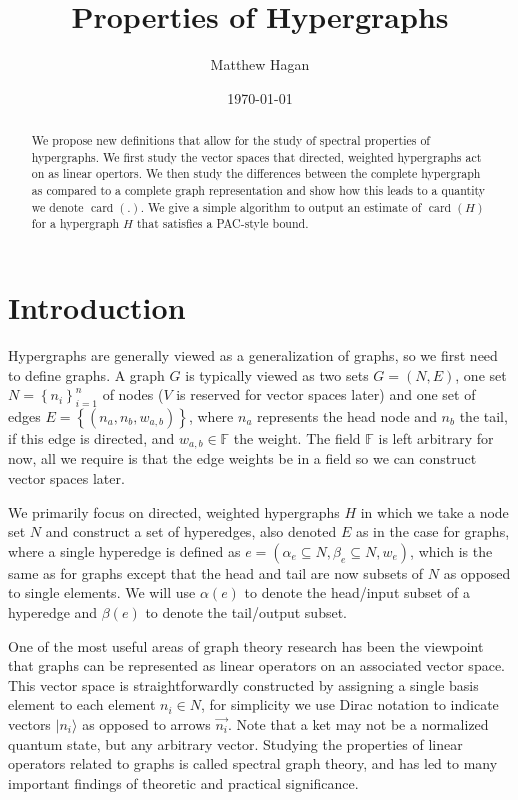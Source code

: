 \documentclass{article}
\title{Properties of Hypergraphs}
\author{Matthew Hagan}
\date{\today}
\newcommand{\ket}[1]{|#1\rangle}
\newcommand{\set}[1]{\left\{ #1 \right\}}
\newcommand{\field}{\mathbb{F}}
\DeclareMathOperator{\card}{card}
\begin{document}
\maketitle
\begin{abstract}
	We propose new definitions that allow for the study of spectral properties of hypergraphs. We first study the vector spaces that directed, weighted hypergraphs act on as linear opertors. We then study the differences between the complete hypergraph as compared to a complete graph representation and show how this leads to a quantity we denote $\card(.)$.
    We give a simple algorithm to output an estimate of $\card(H)$ for a hypergraph $H$ that satisfies a PAC-style bound.
\end{abstract}

\section{Introduction}
Hypergraphs are generally viewed as a generalization of graphs, so we first need to define graphs. A graph $G$ is typically viewed as two sets $G = (N, E)$, one set $N = \set{n_i}_{i=1}^n$ of nodes ($V$ is reserved for vector spaces later) and one set of edges $E = \set{(n_a, n_b, w_{a,b})}$, where $n_a$ represents the head node and $n_b$ the tail, if this edge is directed, and $w_{a,b} \in \field$ the weight. The field $\field$ is left arbitrary for now, all we require is that the edge weights be in a field so we can construct vector spaces later.

We primarily focus on directed, weighted hypergraphs $H$ in which we take a node set $N$ and construct a set of hyperedges, also denoted $E$ as in the case for graphs, where a single hyperedge is defined as $e = (\alpha_e \subseteq N, \beta_e \subseteq N, w_e)$, which is the same as for graphs except that the head and tail are now subsets of $N$ as opposed to single elements. We will use $\alpha(e)$ to denote the head/input subset of a hyperedge and $\beta(e)$ to denote the tail/output subset. 

One of the most useful areas of graph theory research has been the viewpoint that graphs can be represented as linear operators on an associated vector space. This vector space is straightforwardly constructed by assigning a single basis element to each element $n_i \in N$, for simplicity we use Dirac notation to indicate vectors $\ket{n_i}$ as opposed to arrows $\vec{n_i}$. Note that a ket may not be a normalized quantum state, but any arbitrary vector. Studying the properties of linear operators related to graphs is called spectral graph theory, and has led to many important findings of theoretic and practical significance. 
\end{document}
